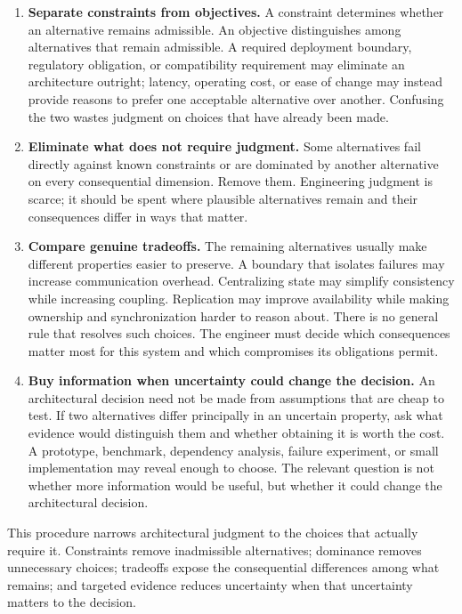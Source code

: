 \begin{enumerate}
\def\labelenumi{\arabic{enumi}.}
\tightlist
\item
  \textbf{Separate constraints from objectives.}
  A constraint determines whether an alternative remains admissible.
  An objective distinguishes among alternatives that remain admissible.
  A required deployment boundary, regulatory obligation, or compatibility requirement may eliminate an architecture outright; latency, operating cost, or ease of change may instead provide reasons to prefer one acceptable alternative over another.
  Confusing the two wastes judgment on choices that have already been made.
\item
  \textbf{Eliminate what does not require judgment.}
  Some alternatives fail directly against known constraints or are dominated by another alternative on every consequential dimension.
  Remove them.
  Engineering judgment is scarce; it should be spent where plausible alternatives remain and their consequences differ in ways that matter.
\item
  \textbf{Compare genuine tradeoffs.}
  The remaining alternatives usually make different properties easier to preserve.
  A boundary that isolates failures may increase communication overhead.
  Centralizing state may simplify consistency while increasing coupling.
  Replication may improve availability while making ownership and synchronization harder to reason about.
  There is no general rule that resolves such choices.
  The engineer must decide which consequences matter most for this system and which compromises its obligations permit.
\item
  \textbf{Buy information when uncertainty could change the decision.}
  An architectural decision need not be made from assumptions that are cheap to test.
  If two alternatives differ principally in an uncertain property, ask what evidence would distinguish them and whether obtaining it is worth the cost.
  A prototype, benchmark, dependency analysis, failure experiment, or small implementation may reveal enough to choose.
  The relevant question is not whether more information would be useful, but whether it could change the architectural decision.
\end{enumerate}

This procedure narrows architectural judgment to the choices that actually require it.
Constraints remove inadmissible alternatives; dominance removes unnecessary choices; tradeoffs expose the consequential differences among what remains; and targeted evidence reduces uncertainty when that uncertainty matters to the decision.

